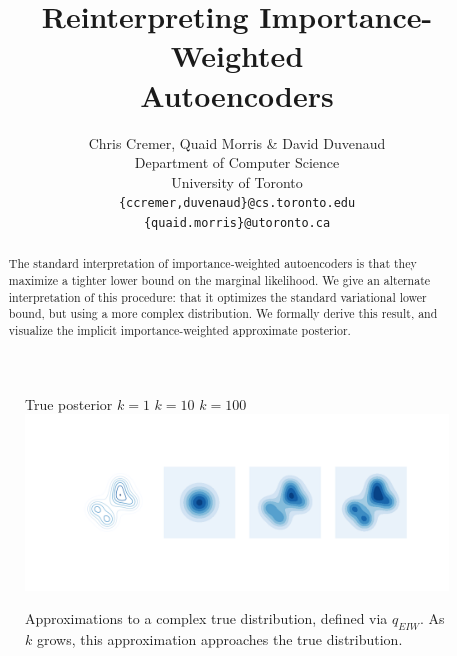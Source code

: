 \documentclass{article} %
\title{Reinterpreting Importance-Weighted \\Autoencoders}
\author{Chris Cremer, Quaid Morris \& David Duvenaud \\
Department of Computer Science\\
University of Toronto\\
\texttt{\{ccremer,duvenaud\}@cs.toronto.edu} \\
\texttt{\{quaid.morris\}@utoronto.ca}
}
\begin{document}
\maketitle

\begin{abstract}
The standard interpretation of importance-weighted autoencoders is that they maximize a tighter lower bound on the marginal likelihood.
We give an alternate interpretation of this procedure: that it optimizes the standard variational lower bound, but using a more complex distribution. 
We formally derive this result, and visualize the implicit importance-weighted approximate posterior.
\end{abstract}
 

\begin{figure}[b]
  \centering
   True posterior \qquad  \qquad $k=1$  \qquad \qquad \qquad $k=10$ \qquad \qquad \qquad $k=100$ \quad
      \includegraphics[width=1.\textwidth, clip, trim=2.5cm 3.9cm 2cm 3.6cm]{figs/figure_1.png}
  \vspace{-5mm}
  \caption{Approximations to a complex true distribution, defined via $q_{EIW}$.
  As $k$ grows, this approximation approaches the true distribution.}
  \label{viz1}
\end{figure}
\end{document}
